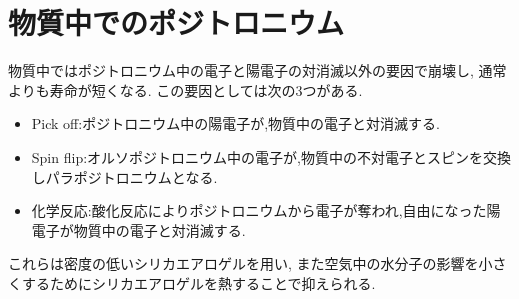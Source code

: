 \section{物質中でのポジトロニウム}

物質中ではポジトロニウム中の電子と陽電子の対消滅以外の要因で崩壊し,
通常よりも寿命が短くなる.
この要因としては次の3つがある.
\begin{itemize}
\item Pick off:ポジトロニウム中の陽電子が,物質中の電子と対消滅する.
\item Spin flip:オルソポジトロニウム中の電子が,物質中の不対電子とスピンを交換しパラポジトロニウムとなる.
\item 化学反応:酸化反応によりポジトロニウムから電子が奪われ,自由になった陽電子が物質中の電子と対消滅する.
\end{itemize}
これらは密度の低いシリカエアロゲルを用い,
また空気中の水分子の影響を小さくするためにシリカエアロゲルを熱することで抑えられる.

%
